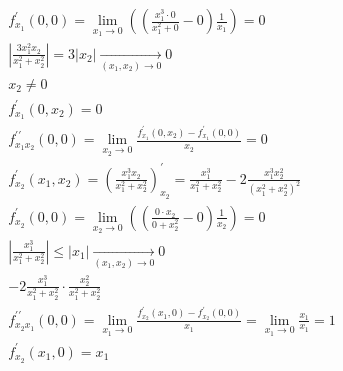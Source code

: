 \documentclass[main]{subfiles}
\begin{document}
        \begin{gather*}
        f^\prime_{x_1}(0,0) = \underset{x_1 \to 0}{\lim} \left ( \left (\frac{x_1^3 \cdot 0}{x_1^2+0} - 0 \right ) \frac{1}{x_1} \right ) = 0\\
        \left | \frac{3x_1^2x_2}{x_1^2 + x_2^2} \right | = 3 |x_2| \underset{(x_1,x_2) \to 0}{\longrightarrow} 0\\
        x_2 \ne 0 \\
        f^\prime_{x_1}(0,x_2) = 0 \\
        f^{\prime\prime}_{x_1x_2}(0,0) = \underset{x_2 \to 0}{\lim} \frac{f^\prime_{x_1}(0,x_2)-f^\prime_{x_1}(0,0)}{x_2} = 0\\
        f^\prime_{x_2}(x_1,x_2) = \left ( \frac{x_1^3x_2}{x_1^2+x_2^2} \right )^\prime_{x_2} = \frac{x_1^3}{x_1^2+x_2^2} - 2\frac{x_1^3x_2^2}{(x_1^2+x_2^2)^2} \\
        f^\prime_{x_2}(0,0) = \underset{x_2 \to 0}{\lim} \left ( \left ( \frac{0 \cdot x_2}{0 + x_2^2} - 0 \right ) \frac{1}{x_2} \right ) = 0 \\
        \left | \frac{x_1^3}{x_1^2 + x_2^2} \right | \leq |x_1| \underset{(x_1,x_2) \to 0}{\longrightarrow} 0 \\
        -2 \frac{x_1^3}{x_1^2+x_2^2} \cdot \frac {x_2^2}{x_1^2+x_2^2} \\
        f^{\prime\prime}_{x_2x_1}(0,0) = \underset{x_1 \to 0}{ \lim} \frac{f^\prime_{x_2}(x_1,0)-f^\prime_{x_2}(0,0)}{x_1} = \underset{x_1 \to 0}{\lim} \frac{x_1}{x_1} = 1 \\
        f^\prime_{x_2}(x_1,0) = x_1\\
    \end{gather*}
\end{document}
